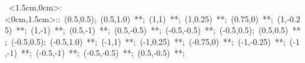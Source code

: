 \hbox{
\xy    <1.5cm,0cm>:<0cm,1.5cm>::
       (0.5,0.5); (0.5,1.0) **\dir{-};
       (1,1) **\dir{-}; (1,0.25) **\dir{-}; (0.75,0) **\dir{-};
       (1,-0.25) **\dir{-}; (1,-1) **\dir{-}; (0.5,-1) **\dir{-};
       (0.5,-0.5) **\dir{-}; (-0.5,-0.5) **\dir{-};
       (-0.5,0.5); (0.5,0.5) **\dir{-};
       (-0.5,0.5); (-0.5,1.0) **\dir{-};
       (-1,1) **\dir{-}; (-1,0.25) **\dir{-}; (-0.75,0) **\dir{-};
       (-1,-0.25) **\dir{-}; (-1,-1) **\dir{-}; (-0.5,-1) **\dir{-};
       (-0.5,-0.5) **\dir{-}; (0.5,-0.5) **\dir{-};
\endxy}
